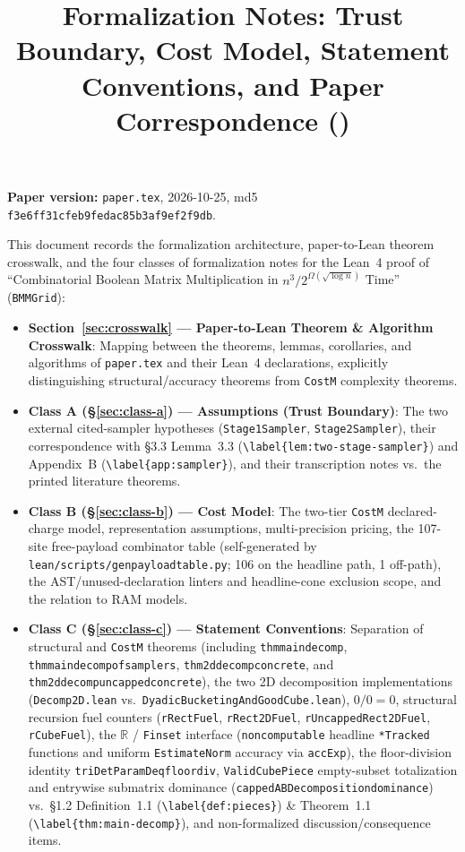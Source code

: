 \documentclass[10pt,letterpaper]{article}
\title{\vspace{-1.2em}\textbf{Formalization Notes: Trust Boundary, Cost Model, Statement Conventions, and Paper Correspondence (\code{BMMGrid})}\vspace{-0.6em}}
\author{}
\date{}
\renewcommand{\_}{\origunderscore\allowbreak}
\newcommand{\code}[1]{\texttt{#1}}
\begin{document}
\maketitle
\vspace{-1.5em}

\textbf{Paper version:} \code{paper.tex}, 2026-10-25, md5 \code{f3e6ff31cfeb9fedac85b3af9ef2f9db}.

This document records the formalization architecture, paper-to-Lean theorem crosswalk, and the four classes of formalization notes for the Lean~4 proof of ``Combinatorial Boolean Matrix Multiplication in $n^3 / 2^{\Omega(\sqrt{\log n})}$ Time'' (\code{BMMGrid}):
\begin{itemize}
  \item \textbf{Section~\ref{sec:crosswalk} --- Paper-to-Lean Theorem \& Algorithm Crosswalk}: Mapping between the theorems, lemmas, corollaries, and algorithms of \code{paper.tex} and their Lean~4 declarations, explicitly distinguishing structural/accuracy theorems from \code{CostM} complexity theorems.
  \item \textbf{Class A (\S\ref{sec:class-a}) --- Assumptions (Trust Boundary)}: The two external cited-sampler hypotheses (\code{Stage1Sampler}, \code{Stage2Sampler}), their correspondence with \S 3.3 Lemma~3.3 (\code{\textbackslash label\{lem:two-stage-sampler\}}) and Appendix~B (\code{\textbackslash label\{app:sampler\}}), and their transcription notes vs.\ the printed literature theorems.
  \item \textbf{Class B (\S\ref{sec:class-b}) --- Cost Model}: The two-tier \code{CostM} declared-charge model, representation assumptions, multi-precision pricing, the 107-site free-payload combinator table (self-generated by \code{lean/scripts/gen\_payload\_table.py}; 106 on the headline path, 1 off-path), the AST/unused-declaration linters and headline-cone exclusion scope, and the relation to RAM models.
  \item \textbf{Class C (\S\ref{sec:class-c}) --- Statement Conventions}: Separation of structural and \code{CostM} theorems (including \code{thm\_main\_decomp}, \code{thm\_main\_decomp\_of\_samplers}, \code{thm\_2d\_decomp\_concrete}, and \code{thm\_2d\_decomp\_uncapped\_concrete}), the two 2D decomposition implementations (\code{Decomp2D.lean} vs.\ \code{DyadicBucketingAndGoodCube.lean}), $0 / 0 = 0$, structural recursion fuel counters (\code{rRectFuel}, \code{rRect2DFuel}, \code{rUncappedRect2DFuel}, \code{rCubeFuel}), the $\mathbb{R}$ / \code{Finset} interface (\code{noncomputable} headline \code{*Tracked} functions and uniform \code{EstimateNorm} accuracy via \code{accExp}), the floor-division identity \code{triDetParamD\_eq\_floor\_div}, \code{ValidCubePiece} empty-subset totalization and entrywise submatrix dominance (\code{cappedABDecomposition\_dominance}) vs.\ \S 1.2 Definition~1.1 (\code{\textbackslash label\{def:pieces\}}) \& Theorem~1.1 (\code{\textbackslash label\{thm:main-decomp\}}), and non-formalized discussion/consequence items.

\end{itemize}
\end{document}
